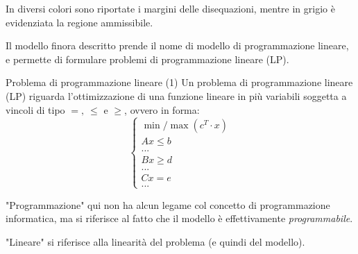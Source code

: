 \documentclass[a4paper,11pt]{article}
\begin{document}
In diversi colori sono riportate i margini delle disequazioni, mentre in grigio è evidenziata la regione ammissibile.

\par\smallskip

Il modello finora descritto prende il nome di modello di programmazione lineare, e permette di formulare problemi di programmazione lineare (LP).

\begin{definition}{Problema di programmazione lineare (1)}
Un problema di programmazione lineare (LP) riguarda l'ottimizzazione di una funzione lineare in più variabili
soggetta a vincoli di tipo $ =, \ \leq $ e $ \geq $, ovvero in forma:
\[
	\begin{cases}
			\min / \max(c^T \cdot x) \\
			A x \leq b \\
			... \\
			B x \geq d \\
			... \\
			C x = e \\
			...
	\end{cases}
\]
\end{definition}

"Programmazione" qui non ha alcun legame col concetto di programmazione informatica, ma si riferisce al fatto che il modello è effettivamente \textit{programmabile}.

"Lineare" si riferisce alla linearità del problema (e quindi del modello).
\end{document}
